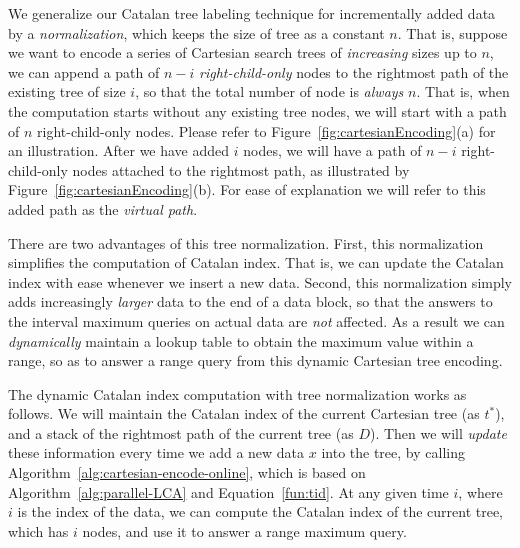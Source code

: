 We generalize our Catalan tree labeling technique for incrementally
added data by a {\em normalization}, which keeps the size of tree as a
constant $n$.  That is, suppose we want to encode a series of
Cartesian search trees of {\em increasing} sizes up to $n$, we can
append a path of $n-i$ {\em right-child-only} nodes to the rightmost
path of the existing tree of size $i$, so that the total number of
node is {\em always} $n$.  That is, when the computation starts
without any existing tree nodes, we will start with a path of $n$
right-child-only nodes.  Please refer to
Figure~\ref{fig:cartesianEncoding}(a) for an illustration.  After we
have added $i$ nodes, we will have a path of $n - i$ right-child-only
nodes attached to the rightmost path, as illustrated by
Figure~\ref{fig:cartesianEncoding}(b).  For ease of explanation we
will refer to this added path as the {\em virtual path}.

\begin{figure*}[!thb]
  \centering {}  
  \caption{Normalization of Cartesian trees of increasing sizes by
    adding a virtual path.}
  \label{fig:cartesianEncoding}
\end{figure*}

There are two advantages of this tree normalization.  First, this
normalization simplifies the computation of Catalan index.  That is,
we can update the Catalan index with ease whenever we insert a new
data. Second, this normalization simply adds increasingly {\em
  larger} data to the end of a data block, so that the answers to the
interval maximum queries on actual data are {\em not} affected.  As a
result we can {\em dynamically} maintain a lookup table to obtain the
maximum value within a range, so as to answer a range query from this
dynamic Cartesian tree encoding.


 
The dynamic Catalan index computation with tree normalization works as
follows.  We will maintain the Catalan index of the current Cartesian
tree (as $t^*$), and a stack of the rightmost path of the current tree
(as $D$).  Then we will {\em update} these information every time we add
a new data $x$ into the tree, by calling
Algorithm~\ref{alg:cartesian-encode-online}, which is based on
Algorithm~\ref{alg:parallel-LCA} and Equation~\ref{fun:tid}.  At any
given time $i$, where $i$ is the index of the data, we can compute the
Catalan index of the current tree, which has $i$ nodes, and use it to
answer a range maximum query.

